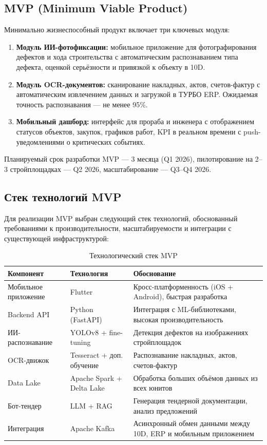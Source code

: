 \documentclass[12pt,a4paper]{article}
\begin{document}
\subsection{MVP (Minimum Viable Product)}

Минимально жизнеспособный продукт включает три ключевых модуля:

\begin{enumerate}[leftmargin=20pt]
  \item \textbf{Модуль ИИ-фотофиксации:} мобильное приложение для фотографирования дефектов и хода строительства с автоматическим распознаванием типа дефекта, оценкой серьёзности и привязкой к объекту в 10D.
  \item \textbf{Модуль OCR-документов:} сканирование накладных, актов, счетов-фактур с автоматическим извлечением данных и загрузкой в ТУРБО ERP. Ожидаемая точность распознавания --- не менее 95\%.
  \item \textbf{Мобильный дашборд:} интерфейс для прораба и инженера с отображением статусов объектов, закупок, графиков работ, KPI в реальном времени с push-уведомлениями о критических событиях.
\end{enumerate}

Планируемый срок разработки MVP --- 3 месяца (Q1 2026), пилотирование на 2--3 стройплощадках --- Q2 2026, масштабирование --- Q3--Q4 2026.

\subsection{Стек технологий MVP}

Для реализации MVP выбран следующий стек технологий, обоснованный требованиями к производительности, масштабируемости и интеграции с существующей инфраструктурой:

\begin{table}[H]
\centering
\caption{Технологический стек MVP}
\label{tab:tech_stack}
\small
\begin{tabularx}{\textwidth}{|l|l|X|}
\hline
\rowcolor{samoletlight}
\textbf{Компонент} & \textbf{Технология} & \textbf{Обоснование} \\
\hline
Мобильное приложение & Flutter & Кросс-платформенность (iOS + Android), быстрая разработка \\
\hline
Backend API & Python (FastAPI) & Интеграция с ML-библиотеками, высокая производительность \\
\hline
ИИ-распознавание & YOLOv8 + fine-tuning & Детекция дефектов на изображениях стройплощадок \\
\hline
OCR-движок & Tesseract + доп. обучение & Распознавание накладных, актов, счетов-фактур \\
\hline
Data Lake & Apache Spark + Delta Lake & Обработка больших объёмов данных из всех юнитов \\
\hline
Бот-тендер & LLM + RAG & Генерация тендерной документации, анализ предложений \\
\hline
Интеграция & Apache Kafka & Асинхронный обмен данными между 10D, ERP и мобильным приложением \\
\hline
\end{tabularx}
\end{table}
\end{document}
